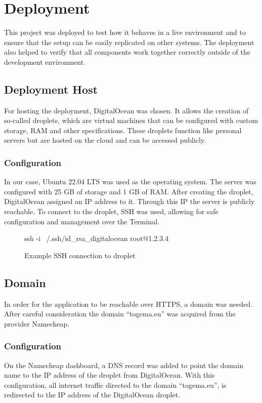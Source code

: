 \documentclass[a4paper,12pt]{report}
\begin{document}
\section{Deployment}
This project was deployed to test how it behaves in a live environment and to ensure that the setup can be easily replicated on other systems. The deployment also helped to verify that all components work together correctly outside of the development environment. \\
\subsection{Deployment Host}
For hosting the deployment, DigitalOcean was chosen. It allows the creation of so-called droplets, which are virtual machines that can be configured with custom storage, RAM and other specifications. These droplets function like personal servers but are hosted on the cloud and can be accessed publicly.
\subsubsection{Configuration}
In our case, Ubuntu 22.04 LTS was used as the operating system. The server was configured with 25 GB of storage and 1 GB of RAM. After creating the droplet, DigitalOcean assigned an IP address to it. Through this IP the server is publicly reachable. To connect to the droplet, SSH was used, allowing for safe configuration and management over the Terminal.
\begin{figure}[H]
	\begin{terminal}
		ssh -i ~/.ssh/id_rsa_digitalocean root@1.2.3.4
	\end{terminal}
	\caption{Example SSH connection to droplet}
\end{figure}
\subsection{Domain}
In order for the application to be reachable over HTTPS, a domain was needed. After careful consideration the domain “togema.eu” was acquired from the provider Namecheap.
\subsubsection{Configuration}
On the Namecheap dashboard, a DNS record was added to point the domain name to the IP address of the droplet from DigitalOcean. With this configuration, all internet traffic directed to the domain “togema.eu”, is redirected to the IP address of the DigitalOcean droplet. \\
\end{document}
